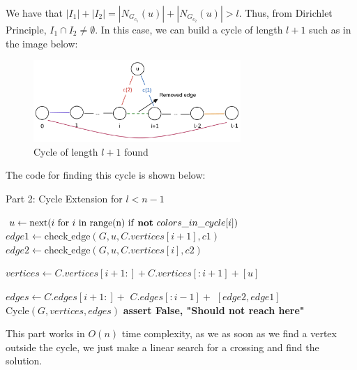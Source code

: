 We have that $|I_1| + |I_2| = |N_{G_{c_1}}(u)| + |N_{G_{c_2}}(u)| > l$. Thus, 
from Dirichlet Principle, $I_1 \cap I_2 \neq \emptyset$. In this case, we can build a cycle of length $l + 1$
such as in the image below:

\begin{figure}[H]
    \centering
    \includegraphics[width=0.7\textwidth]{figuras/cycle_cycle_extension.png}
    \caption{Cycle of length \( l + 1 \) found}
    \label{fig:cycle_cycle_extension}
\end{figure}

The code for finding this cycle is shown below:

\begin{algorithm}[H]
    \caption{Part 2: Cycle Extension for \( l < n - 1 \)}
    \begin{algorithmic}
            \State $u \gets \text{next}(i \text{ for } i \text{ in range(n) if \textbf{not} } colors\_in\_cycle[i])$
                \State $edge1 \gets \text{check\_edge}(G, u, C.vertices[i + 1], c1)$
                \State $edge2 \gets \text{check\_edge}(G, u, C.vertices[i], c2)$
                
                    \State $vertices \gets C.vertices[i + 1:] + C.vertices[:i + 1] + [u]$

                    \State $edges \gets C.edges[i + 1:] +$
                    \State \hspace{3.3em} $C.edges[:i - 1] +$
                    \State \hspace{3.3em} $[edge2, edge1]$
                    \State \Return $\text{Cycle}(G, vertices, edges)$
                \EndIf
            \EndFor
            \State \textbf{assert False, "Should not reach here"}
        \EndFunction
    \end{algorithmic}
\end{algorithm}

This part works in $O(n)$ time complexity, as we as soon as we find a vertex outside the cycle,
we just make a linear search for a crossing and find the solution.

